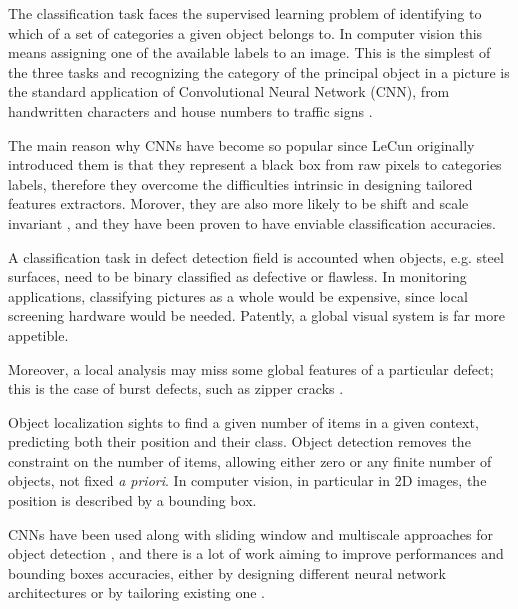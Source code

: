     \par{
        The classification task faces the supervised learning problem of identifying to which of a set of categories a given object belongs to. In computer vision this means assigning one of the available labels to an image. This is the simplest of the three tasks and recognizing the category of the principal object in a picture is the standard application of Convolutional Neural Network (CNN), from handwritten characters \cite{nips:NIPS1989_293, ieee:6248110} and house numbers \cite{ieee:6460867} to traffic signs \cite{ieee:6248110}.

    }
    \par{
        The main reason why CNNs have become so popular since LeCun originally introduced them \cite{nips:NIPS1989_293, ieee:726791, LeCun:1999:ORG:646469.691875, researchgate:deeplearning} is that they represent a black box from raw pixels to categories labels, therefore they overcome the difficulties intrinsic in designing tailored features extractors. Morover, they are also more likely to be shift and scale invariant \cite{LeCun:1999:ORG:646469.691875}, and they have been proven to have enviable classification accuracies.
    }
    \par{
        A classification task in defect detection field is accounted when objects, e.g. steel surfaces, need to be binary classified as defective or flawless. In monitoring applications, classifying pictures as a whole would be expensive, since local screening hardware would be needed. Patently, a global visual system is far more appetible. 
    }
    \par{
        Moreover, a local analysis may miss some global features of a particular defect; this is the case of burst defects, such as zipper cracks \cite{defects:mainlinemetals}.
    }
    \par{
        Object localization sights to find a given number of items in a given context, predicting both their position and their class. Object detection removes the constraint on the number of items, allowing either zero or any finite number of objects, not fixed \emph{a priori}. In computer vision, in particular in 2D images, the position is described by a bounding box.
    }
    \par{
        CNNs have been used along with sliding window and multiscale approaches for object detection \cite{ieee:7410526, ieee:7532516, arXiv:1312.6229S}, and there is a lot of work aiming to improve performances and bounding boxes accuracies, either by designing different neural network architectures \cite{ieee:7410526} or by tailoring existing one \cite{ieee:726791}.
    }
